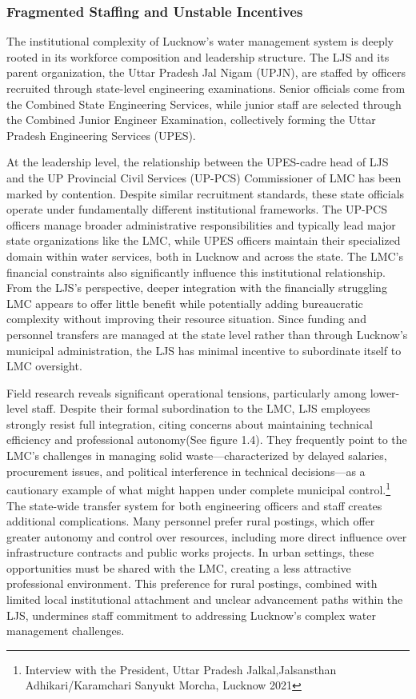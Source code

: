 \subsubsection{Fragmented Staffing and Unstable Incentives}

The institutional complexity of Lucknow's water management system is deeply rooted in its workforce composition and leadership structure. The LJS and its parent organization, the Uttar Pradesh Jal Nigam (UPJN), are staffed by officers recruited through state-level engineering examinations. Senior officials come from the Combined State Engineering Services, while junior staff are selected through the Combined Junior Engineer Examination, collectively forming the Uttar Pradesh Engineering Services (UPES).

At the leadership level, the relationship between the UPES-cadre head of LJS and the UP Provincial Civil Services (UP-PCS) Commissioner of LMC has been marked by contention. Despite similar recruitment standards, these state officials operate under fundamentally different institutional frameworks. The UP-PCS officers manage broader administrative responsibilities and typically lead major state organizations like the LMC, while UPES officers maintain their specialized domain within water services, both in Lucknow and across the state.
The LMC's financial constraints also significantly influence this institutional relationship. From the LJS's perspective, deeper integration with the financially struggling LMC appears to offer little benefit while potentially adding bureaucratic complexity without improving their resource situation. Since funding and personnel transfers are managed at the state level rather than through Lucknow's municipal administration, the LJS has minimal incentive to subordinate itself to LMC oversight.

Field research reveals significant operational tensions, particularly among lower-level staff. Despite their formal subordination to the LMC, LJS employees strongly resist full integration, citing concerns about maintaining technical efficiency and professional autonomy(See figure 1.4). They frequently point to the LMC's challenges in managing solid waste—characterized by delayed salaries, procurement issues, and political interference in technical decisions—as a cautionary example of what might happen under complete municipal control.\footnote{Interview with the President, Uttar Pradesh Jalkal,Jalsansthan Adhikari/Karamchari Sanyukt Morcha, Lucknow 2021}
The state-wide transfer system for both engineering officers and staff creates additional complications. Many personnel prefer rural postings, which offer greater autonomy and control over resources, including more direct influence over infrastructure contracts and public works projects. In urban settings, these opportunities must be shared with the LMC, creating a less attractive professional environment. This preference for rural postings, combined with limited local institutional attachment and unclear advancement paths within the LJS, undermines staff commitment to addressing Lucknow's complex water management challenges.

